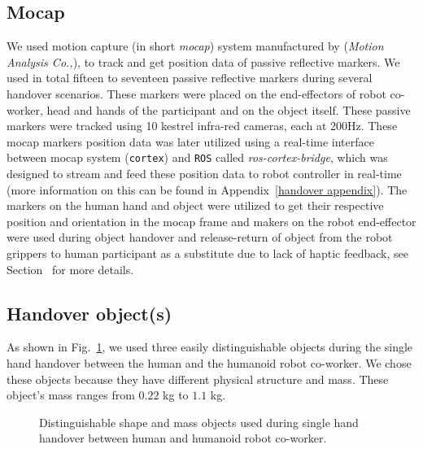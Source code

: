\subsection{Mocap}
We used motion capture (in short \textit{mocap}) system manufactured by ({\it Motion Analysis Co.,}), to track and get position data of passive reflective markers. We used in total fifteen to seventeen passive reflective markers during several handover scenarios. These markers were placed on the end-effectors of robot co-worker, head and hands of the participant and on the object itself. These passive markers were tracked using 10 kestrel infra-red cameras, each at 200Hz. These mocap markers position data was later utilized using a real-time interface between mocap system (\texttt{cortex}) and \texttt{ROS} called \textit{ros-cortex-bridge}, which was designed to stream and feed these position data to robot controller in real-time (more information on this can be found in Appendix~\ref{handover appendix}). The markers on the human hand and object were utilized to get their respective position and orientation in the mocap frame and makers on the robot end-effector were used during object handover and release-return of object from  the robot grippers to human participant as a substitute due to lack of haptic feedback, see Section~ for more details.

\subsection{Handover object(s)}

As shown in Fig.~\ref{fig:objects}, we used three easily distinguishable objects during the single hand handover between the human and the humanoid robot co-worker. We chose these objects because they have different physical structure and mass. These object's mass ranges from $0.22$ kg to $1.1$ kg.


\begin{figure}[htpb]
	\caption{Distinguishable shape and mass objects used during single hand handover between human and humanoid robot co-worker.}
	\label{fig:objects}
\end{figure}


